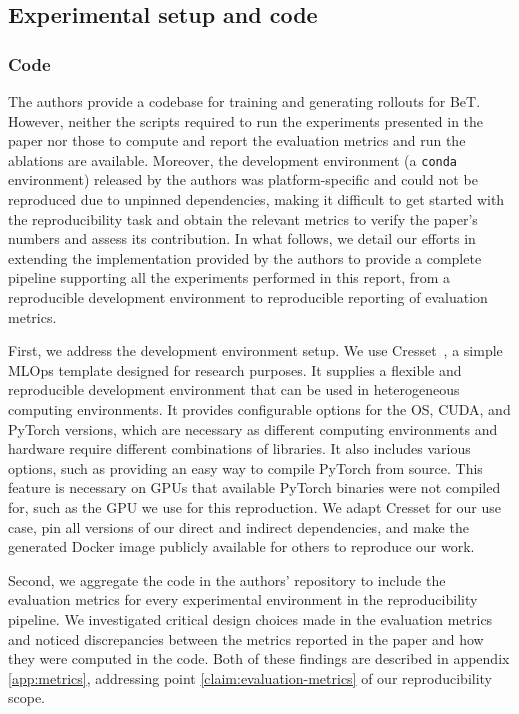 \subsection{Experimental setup and code}\label{sec:exp-and-code}

\subsubsection{Code}\label{sec:code}
The authors provide a codebase \cite{shafiullah2022behavior} for training and generating rollouts for BeT.
However, neither the scripts required to run the experiments presented in the paper nor those to compute and report the evaluation metrics and run the ablations are available.
Moreover, the development environment (a \texttt{conda} environment) released by the authors was platform-specific and could not be reproduced due to unpinned dependencies, making it difficult to get started with the reproducibility task and obtain the relevant metrics to verify the paper's numbers and assess its contribution.
In what follows, we detail our efforts in extending the implementation provided by the authors to provide a complete pipeline supporting all the experiments performed in this report, from a reproducible development environment to reproducible reporting of evaluation metrics.

First, we address the development environment setup.
We use Cresset~\cite{noauthor_cresset_2022}, a simple MLOps template designed for research purposes.
It supplies a flexible and reproducible development environment that can be used in heterogeneous computing environments.
It provides configurable options for the OS, CUDA, and PyTorch versions, which are necessary as different computing environments and hardware require different combinations of libraries.
It also includes various options, such as providing an easy way to compile PyTorch from source.
This feature is necessary on GPUs that available PyTorch binaries were not compiled for, such as the GPU we use for this reproduction.
We adapt Cresset for our use case, pin all versions of our direct and indirect dependencies, and make the generated Docker image publicly available for others to reproduce our work.

Second, we aggregate the code in the authors' repository to include the evaluation metrics for every experimental environment in the reproducibility pipeline.
We investigated critical design choices made in the evaluation metrics and noticed discrepancies between the metrics reported in the paper and how they were computed in the code.
Both of these findings are described in appendix \ref{app:metrics}, addressing point \ref{claim:evaluation-metrics} of our reproducibility scope.

